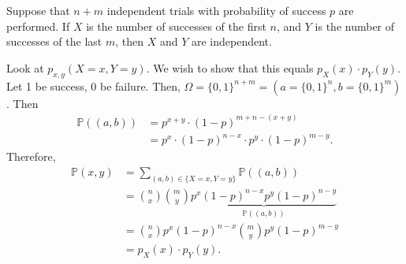 
\begin{eg}
	Suppose that \( n+m \) independent trials with probability of success \( p \) are performed. If \( X \) is the number of successes of the first \( n \), and \( Y \) is the number of successes of the last \( m \), then \( X \) and \( Y \) are independent.
\end{eg}
\begin{explanation}
	Look at \( p_{x,y}(X=x,Y=y) \). We wish to show that this equals \( p_X(x) \cdot p_Y(y) \). Let 1 be success, 0 be failure. Then, \( \Omega = \{0,1\} ^{n+m} = (a = \{0,1\} ^{n}  , b=\{0,1\} ^{m}  )  \). Then 
	\begin{align*}
		\mathbb{P}((a, b)) &= p^{x+y} \cdot (1-p)^{m + n - (x + y)}  \\
		&= p^{x}\cdot (1-p)^{n-x} \cdot p^{y}\cdot (1-p)^{m-y}
	.\end{align*}
	Therefore, 
	\begin{align*}
		\mathbb{P}(x, y) &= \sum_{(a,b) \in \{X=x,Y=y\}  } \mathbb{P}((a,b)) \\
										 &= \binom{n}{x} \binom{m}{y} \underbrace{p^{x} (1-p)^{n-x} p^{y}(1-p)^{n-y}}_{\mathbb{P}((a, b))}     \\
		&= \binom{n}{x} p^{x}(1-p)^{n-x} \binom{m}{y}p^{y}(1-p)^{m-y}    \\
		&= p_X(x) \cdot p_Y(y)
	.\end{align*}
\end{explanation}

